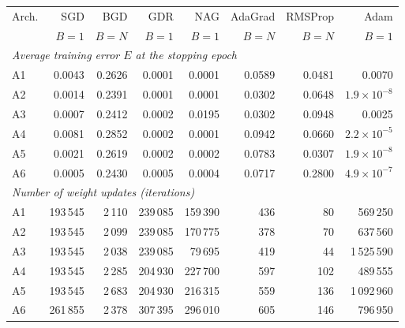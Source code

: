 \begin{tabular}{lrrrrrrr}
\toprule
Arch. & SGD & BGD & GDR & NAG & AdaGrad & RMSProp & Adam \\
 & {\scriptsize $B{=}1$} & {\scriptsize $B{=}N$} & {\scriptsize $B{=}1$} & {\scriptsize $B{=}1$} & {\scriptsize $B{=}N$} & {\scriptsize $B{=}N$} & {\scriptsize $B{=}1$} \\
\midrule
\multicolumn{8}{l}{\emph{Average training error $E$ at the stopping epoch}} \\
A1 & 0.0043 & 0.2626 & 0.0001 & 0.0001 & 0.0589 & 0.0481 & 0.0070 \\
A2 & 0.0014 & 0.2391 & 0.0001 & 0.0001 & 0.0302 & 0.0648 & $1.9{\times}10^{-8}$ \\
A3 & 0.0007 & 0.2412 & 0.0002 & 0.0195 & 0.0302 & 0.0948 & 0.0025 \\
A4 & 0.0081 & 0.2852 & 0.0002 & 0.0001 & 0.0942 & 0.0660 & $2.2{\times}10^{-5}$ \\
A5 & 0.0021 & 0.2619 & 0.0002 & 0.0002 & 0.0783 & 0.0307 & $1.9{\times}10^{-8}$ \\
A6 & 0.0005 & 0.2430 & 0.0005 & 0.0004 & 0.0717 & 0.2800 & $4.9{\times}10^{-7}$ \\
\midrule
\multicolumn{8}{l}{\emph{Number of weight updates (iterations)}} \\
A1 & 193\,545 & 2\,110 & 239\,085 & 159\,390 & 436 & 80 & 569\,250 \\
A2 & 193\,545 & 2\,099 & 239\,085 & 170\,775 & 378 & 70 & 637\,560 \\
A3 & 193\,545 & 2\,038 & 239\,085 & 79\,695 & 419 & 44 & 1\,525\,590 \\
A4 & 193\,545 & 2\,285 & 204\,930 & 227\,700 & 597 & 102 & 489\,555 \\
A5 & 193\,545 & 2\,683 & 204\,930 & 216\,315 & 559 & 136 & 1\,092\,960 \\
A6 & 261\,855 & 2\,378 & 307\,395 & 296\,010 & 605 & 146 & 796\,950 \\
\bottomrule
\end{tabular}
